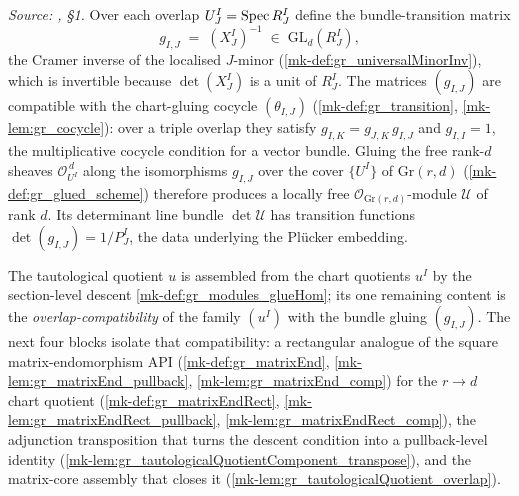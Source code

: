 \begin{definition}\label{mk-def:gr_universal_quotient_sheaf}
  \leanok

  \textit{Source: \cite{nitsure-hilbert-quot}, \S 1.}
  Over each overlap \(U^I_J = \operatorname{Spec} R^I_J\) define the bundle-transition matrix
  \[
    g_{I,J} \;=\; (X^I_J)^{-1} \;\in\; \mathrm{GL}_d(R^I_J),
  \]
  the Cramer inverse of the localised \(J\)-minor (\ref{mk-def:gr_universalMinorInv}),
  which is invertible because \(\det(X^I_J)\) is a unit of \(R^I_J\). The matrices
  \((g_{I,J})\) are compatible with the chart-gluing cocycle \((\theta_{I,J})\)
  (\ref{mk-def:gr_transition}, \ref{mk-lem:gr_cocycle}): over a triple overlap they
  satisfy \(g_{I,K} = g_{J,K}\, g_{I,J}\) and \(g_{I,I} = 1\), the multiplicative
  cocycle condition for a vector bundle. Gluing the free rank-\(d\) sheaves
  \(\mathcal{O}_{U^I}^{\,d}\) along the isomorphisms \(g_{I,J}\) over the cover
  \(\{U^I\}\) of \(\mathrm{Gr}(r,d)\) (\ref{mk-def:gr_glued_scheme}) therefore
  produces a locally free \(\mathcal{O}_{\mathrm{Gr}(r,d)}\)-module
  \(\mathcal{U}\) of rank \(d\). Its determinant line bundle \(\det \mathcal{U}\)
  has transition functions \(\det(g_{I,J}) = 1/P^I_J\), the data underlying the
  Pl\"ucker embedding.
\end{definition}

The tautological quotient \(u\) is assembled from the chart quotients \(u^I\) by the
section-level descent \ref{mk-def:gr_modules_glueHom}; its one remaining content is the
\emph{overlap-compatibility} of the family \((u^I)\) with the bundle gluing
\((g_{I,J})\). The next four blocks isolate that compatibility: a rectangular analogue of
the square matrix-endomorphism API (\ref{mk-def:gr_matrixEnd},
\ref{mk-lem:gr_matrixEnd_pullback}, \ref{mk-lem:gr_matrixEnd_comp}) for the
\(r \to d\) chart quotient (\ref{mk-def:gr_matrixEndRect},
\ref{mk-lem:gr_matrixEndRect_pullback}, \ref{mk-lem:gr_matrixEndRect_comp}), the
adjunction transposition that turns the descent condition into a pullback-level identity
(\ref{mk-lem:gr_tautologicalQuotientComponent_transpose}), and the matrix-core assembly
that closes it (\ref{mk-lem:gr_tautologicalQuotient_overlap}).

